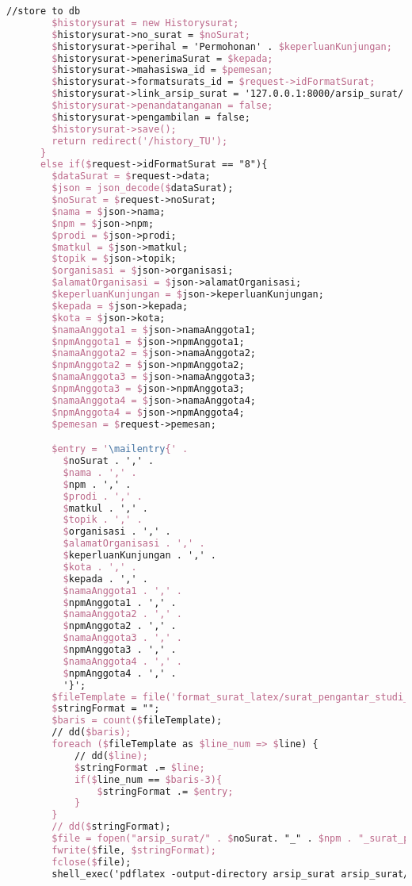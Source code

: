 \begin{lstlisting}[language=tex,basicstyle=\tiny,caption=HistorysuratController.php]
        //store to db
        $historysurat = new Historysurat;
        $historysurat->no_surat = $noSurat;
        $historysurat->perihal = 'Permohonan' . $keperluanKunjungan;
        $historysurat->penerimaSurat = $kepada;
        $historysurat->mahasiswa_id = $pemesan;
        $historysurat->formatsurats_id = $request->idFormatSurat;
        $historysurat->link_arsip_surat = '127.0.0.1:8000/arsip_surat/' . $noSurat. '_' . $npm . '_surat_pengantar_studi_lapangan_4orang.pdf';
        $historysurat->penandatanganan = false;
        $historysurat->pengambilan = false;
        $historysurat->save();
        return redirect('/history_TU');
      }
      else if($request->idFormatSurat == "8"){
        $dataSurat = $request->data;
        $json = json_decode($dataSurat);
        $noSurat = $request->noSurat;
        $nama = $json->nama;
        $npm = $json->npm;
        $prodi = $json->prodi;
        $matkul = $json->matkul;
        $topik = $json->topik;
        $organisasi = $json->organisasi;
        $alamatOrganisasi = $json->alamatOrganisasi;
        $keperluanKunjungan = $json->keperluanKunjungan;
        $kepada = $json->kepada;
        $kota = $json->kota;
        $namaAnggota1 = $json->namaAnggota1;
        $npmAnggota1 = $json->npmAnggota1;
        $namaAnggota2 = $json->namaAnggota2;
        $npmAnggota2 = $json->npmAnggota2;
        $namaAnggota3 = $json->namaAnggota3;
        $npmAnggota3 = $json->npmAnggota3;
        $namaAnggota4 = $json->namaAnggota4;
        $npmAnggota4 = $json->npmAnggota4;
        $pemesan = $request->pemesan;

        $entry = '\mailentry{' .
          $noSurat . ',' .
          $nama . ',' .
          $npm . ',' .
          $prodi . ',' .
          $matkul . ',' .
          $topik . ',' .
          $organisasi . ',' .
          $alamatOrganisasi . ',' .
          $keperluanKunjungan . ',' .
          $kota . ',' .
          $kepada . ',' .
          $namaAnggota1 . ',' .
          $npmAnggota1 . ',' .
          $namaAnggota2 . ',' .
          $npmAnggota2 . ',' .
          $namaAnggota3 . ',' .
          $npmAnggota3 . ',' .
          $namaAnggota4 . ',' .
          $npmAnggota4 . ',' .
          '}';
        $fileTemplate = file('format_surat_latex/surat_pengantar_studi_lapangan_5orang.tex');
        $stringFormat = "";
        $baris = count($fileTemplate);
        // dd($baris);
        foreach ($fileTemplate as $line_num => $line) {
            // dd($line);
            $stringFormat .= $line;
            if($line_num == $baris-3){
                $stringFormat .= $entry;
            }
        }
        // dd($stringFormat);
        $file = fopen("arsip_surat/" . $noSurat. "_" . $npm . "_surat_pengantar_studi_lapangan_5orang.tex", "w");
        fwrite($file, $stringFormat);
        fclose($file);
        shell_exec('pdflatex -output-directory arsip_surat arsip_surat/' . $noSurat . '_' . $npm . '_surat_pengantar_studi_lapangan_5orang.tex');


\end{lstlisting}
